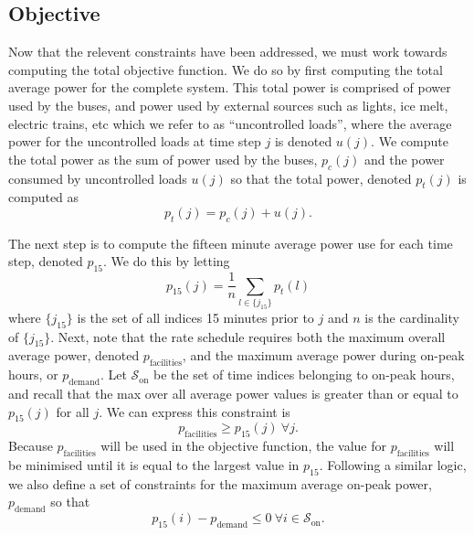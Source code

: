 \subsection{Objective\label{sec:objective}}
\par Now that the relevent constraints have been addressed, we must work towards computing the total objective function. We do so by first computing the total average power for the complete system. This total power is comprised of power used by the buses, and power used by external sources such as lights, ice melt, electric trains, etc which we refer to as ``uncontrolled loads'', where the average power for the uncontrolled loads at time step $j$ is denoted $u(j)$. We compute the total power as the sum of power used by the buses, $p_c(j)$ and the power consumed by uncontrolled loads $u(j)$ so that the total power, denoted $p_t(j)$ is computed as 
\begin{equation}\label{eqn:objective:pt}
	p_t(j) = p_c(j) + u(j).
\end{equation}
\par The next step is to compute the fifteen minute average power use for each time step, denoted $p_{\text{15}}$. We do this by letting 
\begin{equation}\label{eqn:objective:p15}
p_{\text{15}}(j) = \frac{1}{n}\sum_{l \in \{j_{15}\}}p_t(l)
\end{equation}
where $\{j_{15}\}$ is the set of all indices 15 minutes prior to $j$ and $n$ is the cardinality of $\{j_{15}\}$.
Next, note that the rate schedule requires both the maximum overall average power, denoted $p_{\text{facilities}}$, and the maximum average power during on-peak hours, or $p_{\text{demand}}$. Let $\mathcal{S}_{\text{on}}$ be the set of time indices belonging to on-peak hours, and recall that the max over all average power values is greater than or equal to $p_{15}(j)$ for all $j$. We can express this constraint is
\begin{equation}\label{eqn:objective:pFac}
	p_{\text{facilities}} \ge p_{15}(j) \ \forall j.
\end{equation}
Because $p_{\text{facilities}}$ will be used in the objective function, the value for $p_{\text{facilities}}$ will be minimised until it is equal to the largest value in $p_{15}$. Following a similar logic, we also define a set of constraints for the maximum average on-peak power, $p_{\text{demand}}$ so that
\begin{equation}\label{eqn:objective:pDem}
	p_{15}(i) - p_{\text{demand}} \le 0 \ \forall i \in \mathcal{S}_{\text{on}}.
\end{equation}
